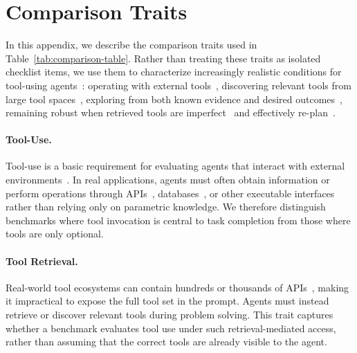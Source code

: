 \clearpage

\appendix



\section{Comparison Traits}
\label{app:comparison-traits}


In this appendix, we describe the comparison traits used in Table~\ref{tab:comparison-table}. 
Rather than treating these traits as isolated checklist items, we use them to characterize increasingly realistic conditions for tool-using agents~\citep{yao2024taubench}: operating with external tools~\citep{ToolOrchestra,xRouter}, discovering relevant tools from large tool spaces~\citep{APIBench,ToolBench, ToolRet}, exploring from both known evidence and desired outcomes~\citep{NAACL,EscapeBench}, remaining robust when retrieved tools are imperfect~\citep{ToolGym} and effectively re-plan~\citep{shen2023taskbench, CostBench,AdaPlanBench}.

\paragraph{Tool-Use.}
Tool-use is a basic requirement for evaluating agents that interact with external environments~\citep{ToolRL}.
In real applications, agents must often obtain information or perform operations through APIs~\citep{APIBench}, databases~\citep{LiveAPIBench}, or other executable interfaces~\citep{SWEAgent} rather than relying only on parametric knowledge.
We therefore distinguish benchmarks where tool invocation is central to task completion from those where tools are only optional.

\paragraph{Tool Retrieval.}
Real-world tool ecosystems can contain hundreds or thousands of APIs~\citep{ToolLLM, LiveAPIBench, liu-etal-2024-gprooft}, making it impractical to expose the full tool set in the prompt. 
Agents must instead retrieve or discover relevant tools during problem solving. 
This trait captures whether a benchmark evaluates tool use under such retrieval-mediated access, rather than assuming that the correct tools are already visible to the agent.

